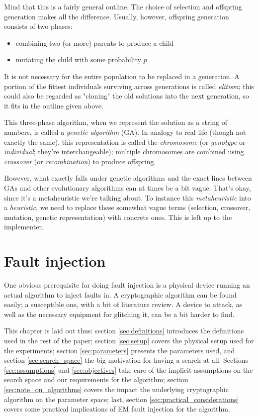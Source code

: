 \documentclass[times, utf8, diplomski]{fer}
\begin{document}
Mind that this is a fairly general outline.
The choice of selection and offspring generation makes all the difference.
Usually, however, offspring generation consists of two phases:
\begin{itemize}
    \item combining two (or more) parents to produce a child
    \item mutating the child with some probability $p$
\end{itemize}
It is not necessary for the entire population to be replaced in a generation.
A portion of the fittest individuals surviving across generations is called
\emph{elitism}; this could also be regarded as "cloning" the old solutions into
the next generation, so it fits in the outline given above.

This three-phase algorithm, when we represent the solution as a string of numbers,
is called a \emph{genetic algorithm} (GA).
In analogy to real life (though not exactly the same), this representation is
called the \emph{chromosome} (or \emph{genotype} or \emph{individual}; they're
interchangeable); multiple chromosomes are combined using \emph{crossover}
(or \emph{recombination}) to produce offspring.

However, what exactly falls under genetic algorithms and the exact lines between
GAs and other evolutionary algorithms can at times be a bit vague. That's okay,
since it's a metaheuristic we're talking about.
To instance this \emph{metaheuristic} into a \emph{heuristic}, we need to replace
these somewhat vague terms (selection, crossover, mutation, genetic representation)
with concrete ones. This is left up to the implementer.



\chapter{Fault injection}\label{ch:fault_injection}
One obvious prerequisite for doing fault injection is a physical device running
an actual algorithm to inject faults in. A cryptographic algorithm can be found
easily; a susceptible one, with a bit of literature review. A device to
attack, as well as the necessary equipment for glitching it, can be a bit harder
to find.

This chapter is laid out thus: section \ref{sec:definitions} introduces the
definitions used in the rest of the paper; section \ref{sec:setup} covers
the physical setup used for the experiments; section \ref{sec:parameters}
presents the parameters used, and section \ref{sec:search_space} the big
motivation for having a search at all. Sections \ref{sec:assumptions} and
\ref{sec:objectives} take care of the implicit assumptions on the search
space and our requirements for the algorithm; section \ref{sec:note_on_algorithms}
covers the impact the underlying cryptographic algorithm on the parameter
space; last, section \ref{sec:practical_considerations} covers some practical
implications of EM fault injection for the algorithm.
\end{document}
